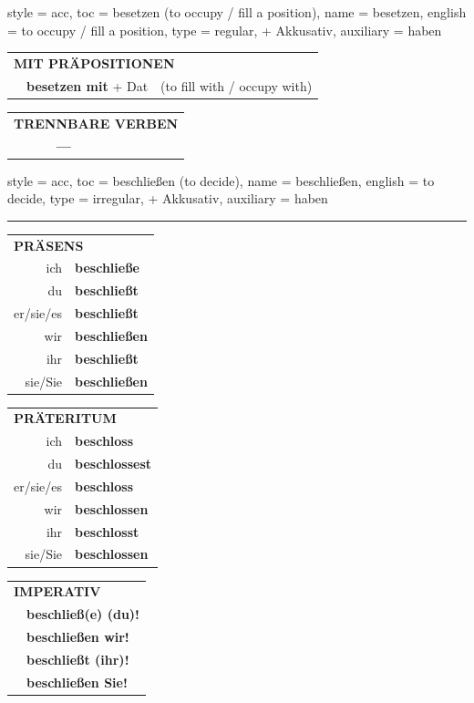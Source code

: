 \begin{verbentry}{
  style = {acc},
  toc = {besetzen (to occupy / fill a position)},
  name = {besetzen},
  english = {to occupy / fill a position},
  type = {regular, + Akkusativ},
  auxiliary = {haben}
}
\vspace{10pt}

\begin{tabular}{lll}
\multicolumn{3}{l}{\textbf{MIT PRÄPOSITIONEN}}\\
& \textbf{besetzen mit} + Dat & (to fill with / occupy with)\\
\end{tabular}
\hfill
\begin{tabular}{lll}
\multicolumn{3}{l}{\textbf{TRENNBARE VERBEN}}\\
& \textbf{---} & \\
\end{tabular}
\vspace{-5pt}
\end{verbentry}

\begin{verbentry}{
  style = {acc},
  toc = {beschließen (to decide)},
  name = {beschließen},
  english = {to decide},
  type = {irregular, + Akkusativ},
  auxiliary = {haben}
}


\vspace{5pt}
\hrule
\vspace{5pt}

\begin{tabular}{rl}
\multicolumn{2}{l}{\textbf{PRÄSENS}}\\
ich & \textbf{beschließe}\\
du & \textbf{beschließt}\\
er/sie/es & \textbf{beschließt}\\
wir & \textbf{beschließen}\\
ihr & \textbf{beschließt}\\
sie/Sie & \textbf{beschließen}\\
\end{tabular}
\hfill
\begin{tabular}{rl}
\multicolumn{2}{l}{\textbf{PRÄTERITUM}}\\
ich & \textbf{beschloss}\\
du & \textbf{beschlossest}\\
er/sie/es & \textbf{beschloss}\\
wir & \textbf{beschlossen}\\
ihr & \textbf{beschlosst}\\
sie/Sie & \textbf{beschlossen}\\
\end{tabular}
\hfill
\begin{tabular}{rl}
\multicolumn{2}{l}{\textbf{IMPERATIV}}\\
& \textbf{beschließ(e) (du)!}\\
& \textbf{beschließen wir!}\\
& \textbf{beschließt (ihr)!}\\
& \textbf{beschließen Sie!}\\
\end{tabular}


\end{verbentry}
